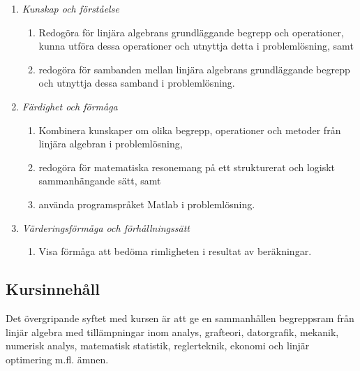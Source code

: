 \begin{enumerate}
\def\labelenumi{\Alph{enumi}.}
\tightlist
\item
  \emph{Kunskap och förståelse}

  \begin{enumerate}
  \def\labelenumii{\Alph{enumi}.\arabic{enumii}.}
  \tightlist
  \item
    Redogöra för linjära algebrans grundläggande begrepp och
    operationer, kunna utföra dessa operationer och utnyttja detta i
    problemlösning, samt
  \item
    redogöra för sambanden mellan linjära algebrans grundläggande
    begrepp och utnyttja dessa samband i problemlösning.
  \end{enumerate}
\item
  \emph{Färdighet och förmåga}

  \begin{enumerate}
  \def\labelenumii{\Alph{enumi}.\arabic{enumii}.}
  \tightlist
  \item
    Kombinera kunskaper om olika begrepp, operationer och metoder från
    linjära algebran i problemlösning,
  \item
    redogöra för matematiska resonemang på ett strukturerat och logiskt
    sammanhängande sätt, samt
  \item
    använda programspråket Matlab i problemlösning.
  \end{enumerate}
\item
  \emph{Värderingsförmåga och förhållningssätt}

  \begin{enumerate}
  \def\labelenumii{\Alph{enumi}.\arabic{enumii}.}
  \tightlist
  \item
    Visa förmåga att bedöma rimligheten i resultat av beräkningar.
  \end{enumerate}
\end{enumerate}

\subsection*{Kursinnehåll}

Det övergripande syftet med kursen är att ge en sammanhållen begreppsram
från linjär algebra med tillämpningar inom analys, grafteori,
datorgrafik, mekanik, numerisk analys, matematisk statistik,
reglerteknik, ekonomi och linjär optimering m.fl. ämnen.

